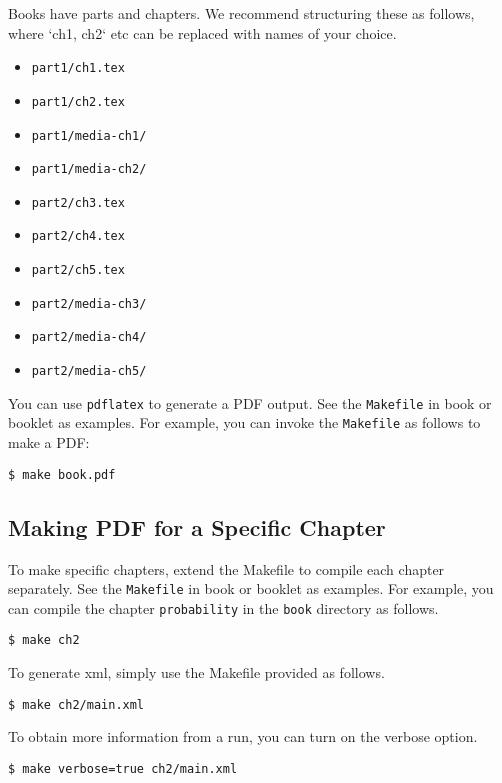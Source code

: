 \begin{gram}[Books]

Books have parts and chapters. We recommend structuring these as follows, where `ch1, ch2` etc can be replaced with names of your choice.
%
\begin{itemize}
\item \lstinline`part1/ch1.tex`
\item \lstinline`part1/ch2.tex`
\item \lstinline`part1/media-ch1/`
\item \lstinline`part1/media-ch2/`
\item \lstinline`part2/ch3.tex`
\item \lstinline`part2/ch4.tex`
\item \lstinline`part2/ch5.tex`
\item \lstinline`part2/media-ch3/`
\item \lstinline`part2/media-ch4/`
\item \lstinline`part2/media-ch5/`
\end{itemize}
   
\end{gram}


\begin{gram}
You can use \lstinline`pdflatex` to generate a PDF output.  See the \lstinline`Makefile` in book or booklet as examples.
%
For example, you can  invoke the \lstinline`Makefile` as follows to make a PDF:
\begin{lstlisting}
$ make book.pdf
\end{lstlisting}

\subsection{Making PDF for a Specific Chapter}
To make specific chapters,  extend the Makefile to compile each chapter separately.  See the \lstinline`Makefile` in book or booklet as examples.
%
For example, you can compile the chapter \lstinline`probability` in the \lstinline`book` directory as follows.
\begin{lstlisting}
$ make ch2
\end{lstlisting}
\end{gram}

\begin{gram}

To generate xml, simply use the Makefile provided as follows.
%
\begin{lstlisting}
$ make ch2/main.xml
\end{lstlisting}
%

To obtain more information from a run, you can turn on the verbose option.
%
\begin{lstlisting}
$ make verbose=true ch2/main.xml
\end{lstlisting}
\end{gram}

